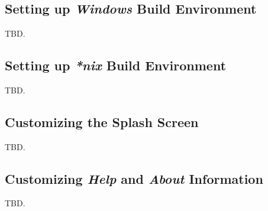 \chapter{\cwbezerotitle{}}

\label{cwbe0}


\section{Setting up \emph{Windows} Build Environment}
\label{cwbe0:sswb0}

TBD.


\section{Setting up \emph{*nix} Build Environment}
\label{cwbe0:ssub0}

TBD.



\section{Customizing the Splash Screen}
\label{cwbe0:scss0}

TBD.


\section{Customizing \emph{Help} and \emph{About} Information}
\label{cwbe0:scha0}

TBD.


